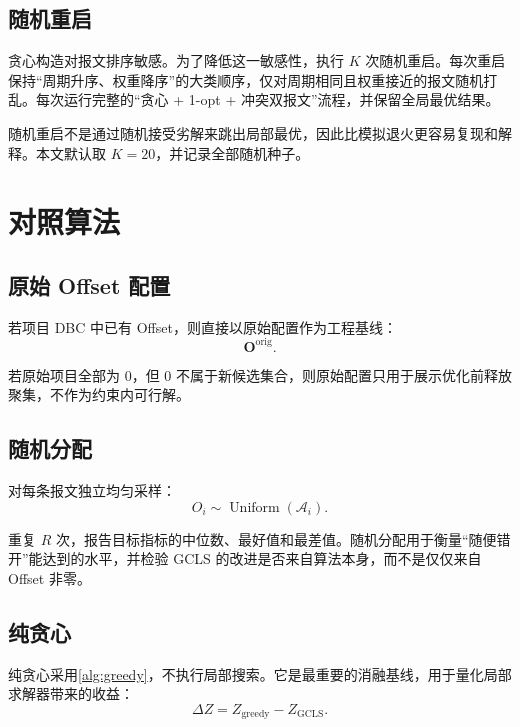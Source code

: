 \documentclass[UTF8,12pt,a4paper]{ctexart}
\newcommand{\Oset}{\mathcal{A}}
\begin{document}
\subsection{随机重启}

贪心构造对报文排序敏感。为了降低这一敏感性，执行 $K$ 次随机重启。每次重启保持“周期升序、权重降序”的大类顺序，仅对周期相同且权重接近的报文随机打乱。每次运行完整的“贪心 + 1-opt + 冲突双报文”流程，并保留全局最优结果。

随机重启不是通过随机接受劣解来跳出局部最优，因此比模拟退火更容易复现和解释。本文默认取 $K=20$，并记录全部随机种子。

\section{对照算法}

\subsection{原始 Offset 配置}

若项目 DBC 中已有 Offset，则直接以原始配置作为工程基线：
\begin{equation}
 \symbf{O}^{\mathrm{orig}}.
\end{equation}

若原始项目全部为 0，但 0 不属于新候选集合，则原始配置只用于展示优化前释放聚集，不作为约束内可行解。

\subsection{随机分配}

对每条报文独立均匀采样：
\begin{equation}
 O_i\sim \operatorname{Uniform}(\Oset_i).
\end{equation}

重复 $R$ 次，报告目标指标的中位数、最好值和最差值。随机分配用于衡量“随便错开”能达到的水平，并检验 GCLS 的改进是否来自算法本身，而不是仅仅来自 Offset 非零。

\subsection{纯贪心}

纯贪心采用\cref{alg:greedy}，不执行局部搜索。它是最重要的消融基线，用于量化局部求解器带来的收益：
\begin{equation}
 \Delta Z=Z_{\mathrm{greedy}}-Z_{\mathrm{GCLS}}.
\end{equation}
\end{document}
